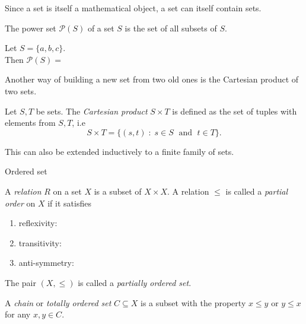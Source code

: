 \documentclass [aspectratio=169, handout]{beamer}
\newcommand{\cP}{\mathcal{P}}
\begin{document}
\begin{frame}
Since a set is itself a mathematical object, a set can itself contain sets.
\begin{definition}
The power set $\cP(S)$ of a set $S$ is the set of all subsets of $S$.
\end{definition}

\vspace{1em}

\begin{example}
Let $S = \{a,b,c\}$.  \\
Then $\cP(S) = $ 
\vspace{5em}
\end{example}
\end{frame}

\begin{frame}
Another way of building a new set from two old ones is the Cartesian product of two sets.

\begin{definition}\label{def:cartes_prod}
Let $S,T$ be sets. The \emph{Cartesian product} $S\times T$ is defined as the set of tuples with elements from $S,T$, i.e 
\begin{equation*}
    S\times T = \{ (s,t) \; \colon \; s \in S \; \text{ and } \; t \in T\}.
\end{equation*}
\end{definition}
\vspace{1em}

This can also be extended inductively to a finite family of sets. 

\end{frame}

\begin{frame}{Ordered set}
\begin{definition}
A \emph{relation} $R$ on a set $X$ is a subset of $X \times X$. A relation $\leq$ is called a \emph{partial order} on $X$ if it satisfies
\begin{enumerate}
\setlength\itemsep{1em}
\item reflexivity: 
\item transitivity: 
\item anti-symmetry: 
\end{enumerate}
\vspace{1em}
The pair $(X, \leq)$ is called a \emph{partially ordered set}.

\vspace{1em}

A \emph{chain} or \emph{totally ordered set} $C \subseteq X$ is a subset with the property $x \leq y$ or $y \leq x$ for any $x,y \in C$.
\end{definition}

\end{frame}
\end{document}
